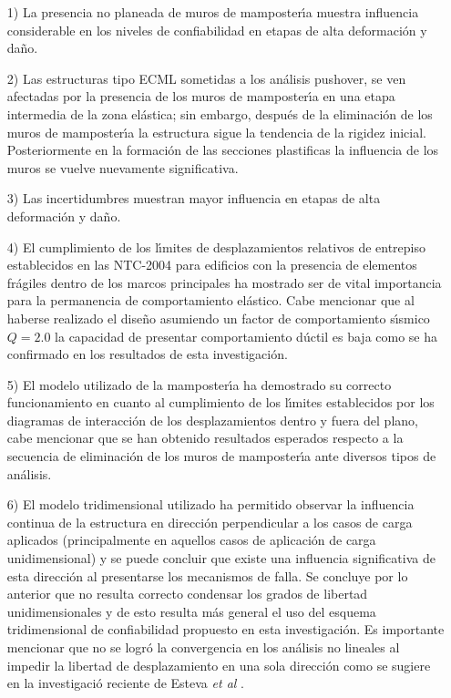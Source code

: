 \begin{itemize}
	\item [1)] La presencia no planeada de muros de mamposter\'{\i}a muestra influencia considerable en los niveles de confiabilidad en etapas de alta deformaci\'on y da\~no.
	\item [2)] Las estructuras tipo ECML sometidas a los an\'alisis pushover, se ven afectadas por la presencia de los muros de mamposter\'{\i}a en una etapa intermedia de la zona el\'astica; sin embargo, despu\'es de la eliminaci\'on de los muros de mamposter\'{\i}a la estructura sigue la tendencia de la rigidez inicial. Posteriormente en la formaci\'on de las secciones plastificas la influencia de los muros se vuelve nuevamente significativa.

	\newpage
	
	\item [3)] Las incertidumbres muestran mayor influencia en etapas de alta deformaci\'on y da\~no.	
	\item [4)] El cumplimiento de los l\'{\i}mites de desplazamientos relativos de entrepiso establecidos en las NTC-2004 \cite{NTC2004} para edificios con la presencia de elementos fr\'agiles dentro de los marcos principales ha mostrado ser de vital importancia para la permanencia de comportamiento el\'astico. Cabe mencionar que al haberse realizado el dise\~no asumiendo un factor de comportamiento s\'{\i}smico $Q=2.0$ la capacidad de presentar comportamiento d\'uctil es baja como se ha confirmado en los resultados de esta investigaci\'on.
	\item [5)] El modelo utilizado de la mamposter\'{\i}a ha demostrado su correcto funcionamiento en cuanto al cumplimiento de los l\'{\i}mites establecidos por los diagramas de interacci\'on de los desplazamientos dentro y fuera del plano, cabe mencionar que se han obtenido resultados esperados respecto a la secuencia de eliminaci\'on de los muros de mamposter\'{\i}a ante diversos tipos de an\'alisis. 
		\item [6)] El modelo tridimensional utilizado ha permitido observar la influencia continua de la estructura en direcci\'on perpendicular a los casos de carga aplicados (principalmente en aquellos casos de aplicaci\'on de carga unidimensional) y se puede concluir que existe una influencia significativa de esta direcci\'on al presentarse los mecanismos de falla. Se concluye por lo anterior que no resulta correcto condensar los grados de libertad unidimensionales y de esto resulta m\'as general el uso del esquema tridimensional de confiabilidad propuesto en esta investigaci\'on. Es importante mencionar que no se logr\'o la convergencia en los an\'alisis no lineales al impedir la libertad de desplazamiento en una sola direcci\'on como se sugiere en la investigaci\'o reciente de Esteva \emph{et al} \cite{CTEM2013}.		
		

\end{itemize}

